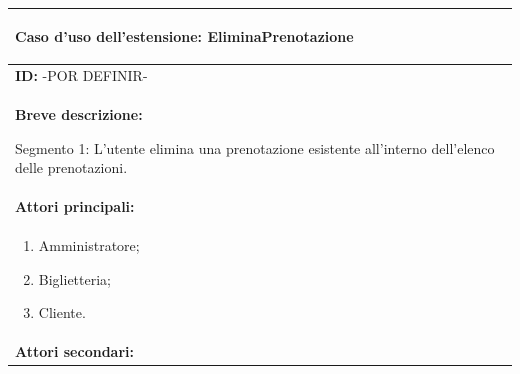 \documentclass{article}
\begin{document}
                \begin{table}[t]
                    \centering
                    \begin{tabular}{|p{\linewidth}|}
                        \hline
                        \cellcolor{gray!100}
                        \color{white}
                        \begin{center}
                            \textbf{Caso d'uso dell'estensione:} EliminaPrenotazione
                        \end{center} \\
                        \hline
                        \textbf{ID:} -POR DEFINIR- \\
                        \hline
                        \cellcolor{gray!20}
                        \textbf{Breve descrizione:}
                        
                        Segmento 1: L'utente elimina una prenotazione esistente all'interno dell'elenco delle prenotazioni. \\
                        \hline
                        \textbf{Attori principali:} \\
                        \begin{minipage}{\linewidth}
                            \begin{enumerate}[noitemsep]
                                \item Amministratore;
                                \item Biglietteria;
                                \item Cliente.
                            \end{enumerate}
                        \end{minipage}
                        \vspace{0pt} \\
                        \hline
                        \textbf{Attori secondari:}
                        

\end{tabular}
\end{table}
\end{document}
